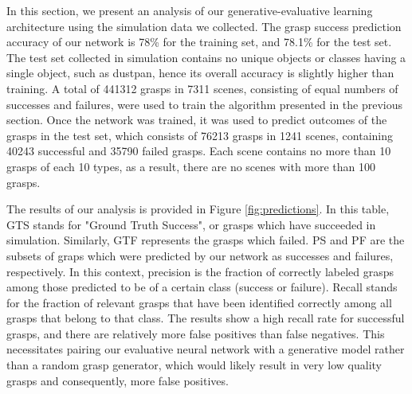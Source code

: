 In this section, we present an analysis of our generative-evaluative learning architecture using the simulation data we collected. The grasp success prediction accuracy of our network is 78\% for the training set, and 78.1\% for the test set. The test set collected in simulation contains no unique objects or classes having a single object, such as dustpan, hence its overall accuracy is slightly higher than training. A total of 441312 grasps in 7311 scenes, consisting of equal numbers of successes and failures, were used to train the algorithm presented in the previous section. Once the network was trained, it was used to predict outcomes of the grasps in the test set, which consists of 76213 grasps in 1241 scenes, containing 40243 successful and 35790 failed grasps. Each scene contains no more than 10 grasps of each 10 types, as a result, there are no scenes with more than 100 grasps. 

The results of our analysis is provided in Figure \ref{fig:predictions}. In this table, GTS stands for "Ground Truth Success", or grasps which have succeeded in simulation. Similarly, GTF represents the grasps which failed. PS and PF are the subsets of graps which were predicted by our network as successes and failures, respectively. In this context, precision is the fraction of correctly labeled grasps among those predicted to be of a certain class (success or failure). Recall stands for the fraction of relevant grasps that have been identified correctly among all grasps that belong to that class. The results show a high recall rate for successful grasps, and there are relatively more false positives than false negatives. This necessitates pairing our evaluative neural network with a generative model rather than a random grasp generator, which would likely result in very low quality grasps and consequently, more false positives. 


